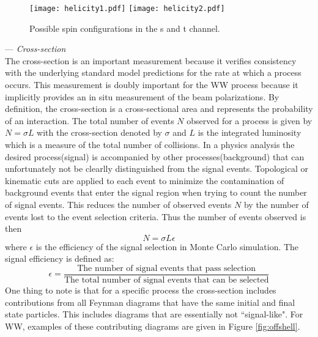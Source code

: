 \begin{figure}

\texttt{[image: helicity1.pdf]}
\texttt{[image: helicity2.pdf]}
\caption{Possible spin configurations in the s and t channel. \cite{helicity}}
\label{fig:spindiag}
\end{figure}


--- \textit{Cross-section}\\
The cross-section is an important measurement because it verifies consistency with the underlying standard model predictions for the rate at which a process occurs. This measurement is doubly important for the WW process because it implicitly provides an in situ measurement of the beam polarizations. By definition, the cross-section is a cross-sectional area and represents the probability of an interaction. The total number of events $N$ observed for a process is given by $ N= \sigma L$ with the cross-section denoted by $\sigma$ and $L$ is the integrated luminosity which is a measure of the total number of collisions. In a physics analysis the desired process(signal) is accompanied by other processes(background) that can unfortunately not be clearlly distinguished from the signal events. Topological or kinematic cuts are applied to each event to minimize the contamination of background events that enter the signal region when trying to count the number of signal events. This reduces the number of observed events $N$ by the number of events lost to the event selection criteria. Thus the number of events observed is then 
\begin{equation}
N = \sigma  L  \epsilon
\end{equation}
where $\epsilon$ is the efficiency of the signal selection in Monte Carlo simulation. The signal efficiency is defined as:
 \begin{equation}
\epsilon = \frac{\text{The number of signal events that pass selection}}{ \text{The total number of signal events that can be selected}}
\end{equation} 
One thing to note is that for a specific process the cross-section includes contributions from all Feynman diagrams that have the same initial and final state particles. This includes diagrams that are essentially not ``signal-like". For WW, examples of these contributing diagrams are given in Figure \ref{fig:offshell}.

